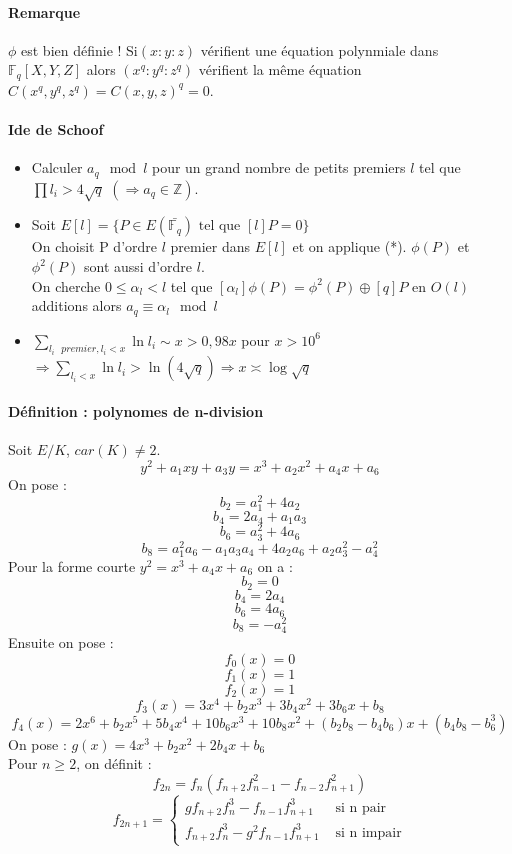 \documentclass[12pt,a4paper]{report}
\begin{document}
\paragraph{Remarque\\}
$\phi$ est bien définie ! Si$(x:y:z)$ vérifient une équation polynmiale dans $\mathbb{F}_q[X,Y,Z]$ alors $(x^q:y^q:z^q)$ vérifient la même équation\\ $ C(x^q,y^q,z^q) = C(x,y,z)^q = 0$.
\paragraph{Ide de Schoof}
\begin{itemize}
\item Calculer $ a_q \mod l$ pour un grand nombre de petits premiers $l$ tel que $ \prod l_i > 4 \sqrt{q}$ $(\Rightarrow a_q \in \mathbb{Z})$.
\item Soit $E[l]=\{P \in E(\bar{\mathbb{F}_q}) \mbox{ tel que } [l]P=0\}$\\
On choisit P d'ordre $l$ premier dans $E[l]$ et on applique (*). $\phi(P)$ et $\phi^2(P)$ sont aussi d'ordre $l$.\\
On cherche $0 \leqslant \alpha_l < l$ tel que $[\alpha_l]\phi(P) = \phi^2(P) \oplus [q]P$ en $O(l)$ additions alors $ a_q \equiv \alpha_l \mod l$
\item $\displaystyle \sum_{l_i \mbox{ } premier, l_i<x} \ln l_i \sim x > 0,98 x$ pour $ x> 10^6$\\
$ \Rightarrow \displaystyle \sum_{l_i <x}\ln l_i > \ln (4\sqrt{q}) \Rightarrow x \asymp \log \sqrt{q} $
\end{itemize}
\paragraph{Définition : polynomes de n-division\\}
Soit $E/K$, $car(K) \neq 2$.
$$ y^2 + a_1 xy + a_3 y = x^3 + a_2 x^2+ a_4 x + a_6 $$
On pose : $$ b_2=a_1^2 + 4 a_2$$
$$ b_4 = 2a_4+a_1a_3$$
$$b_6 = a_3^2 + 4a_6$$
$$ b_8 = a_1^2 a_6 - a_1a_3a_4 + 4a_2a_6 + a_2a_3^2 -a_4^2$$
Pour la forme courte $y^2 = x^3 +a_4x+a_6 $ on a : $$ b_2=0$$ $$ b_4 = 2a_4$$ $$ b_6=4a_6$$ $$b_8=-a_4^2$$
Ensuite on pose :
$$ f_0(x) = 0 $$
$$f_1(x) = 1$$
$$ f_2(x) = 1$$
$$ f_3(x) = 3x^4 + b_2 x^3 + 3b_4x^2 + 3b_6 x + b_8$$
$$ f_4(x) = 2x^6+b_2x^5+5b_4x^4+10b_6x^3+10b_8x^2+(b_2b_8-b_4b_6)x+(b_4b_8-b_6^3)$$
On pose : $ g(x)= 4x^3+b_2x^2+2b_4x+b_6$\\
Pour $n \geqslant 2$, on définit :
$$f_{2n}=f_n(f_{n+2}f_{n-1}^2-f_{n-2}f_{n+1}^2)$$
$$f_{2n+1}=\left\{\begin{array}{ll}
gf_{n+2}f_n^3-f_{n-1}f_{n+1}^3 & \mbox{ si n pair} \\
f_{n+2}f_n^3-g^2f_{n-1}f_{n+1}^3 & \mbox{ si n impair}
\end{array}\right.$$
\end{document}
